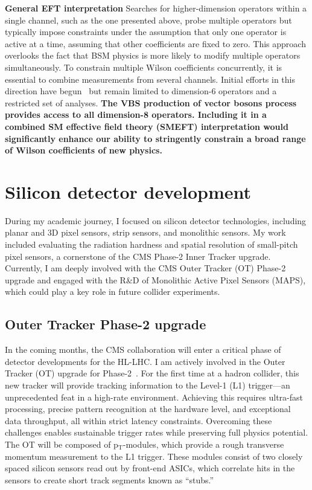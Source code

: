 {\begin{flushleft}
\textbf{General EFT interpretation} 
Searches for higher-dimension operators within a single channel, such as the one presented above, probe multiple operators but typically impose constraints under the assumption that only one operator is active at a time, assuming that other coefficients are fixed to zero. This approach overlooks the fact that BSM physics is more likely to modify multiple operators simultaneously. To constrain multiple Wilson coefficients concurrently, it is essential to combine measurements from several channels. Initial efforts in this direction have begun~\cite{[5]} but remain limited to dimension-6 operators and a restricted set of analyses. {\bf The VBS production of vector bosons process provides access to all dimension-8 operators. Including it in a combined SM effective field theory (SMEFT) interpretation would significantly enhance our ability to stringently constrain a broad range of Wilson coefficients of new physics.}



\section{Silicon detector development}
During my academic journey, I focused on silicon detector technologies, including planar and 3D pixel sensors, strip sensors, and monolithic sensors. My work included evaluating the radiation hardness and spatial resolution of small-pitch pixel sensors, a cornerstone of the CMS Phase-2 Inner Tracker upgrade. Currently, I am deeply involved with the CMS Outer Tracker  (OT) Phase-2 upgrade and engaged with the R\&D of Monolithic Active Pixel Sensors (MAPS), which could play a key role in future collider experiments.
\subsection{Outer Tracker Phase-2 upgrade}
In the coming months, the CMS collaboration will enter a critical phase of detector developments for the HL-LHC. I am actively involved in the Outer Tracker (OT) upgrade for Phase-2~\cite{[6]}. For the first time at a hadron collider, this new tracker will provide tracking information to the Level-1 (L1) trigger—an unprecedented feat in a high-rate environment. Achieving this requires ultra-fast processing, precise pattern recognition at the hardware level, and exceptional data throughput, all within strict latency constraints. Overcoming these challenges enables sustainable trigger rates while preserving full physics potential. %
The OT will be composed of p$_{\mathrm{T}}$-modules, which provide a rough transverse momentum measurement to the L1 trigger. These modules consist of two closely spaced silicon sensors read out by front-end ASICs, which correlate hits in the sensors to create short track segments known as ``stubs.'' %


\end{flushleft}}
